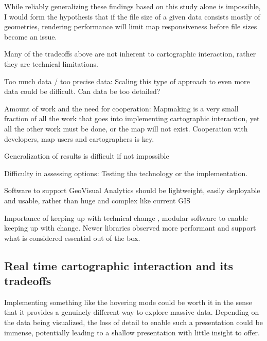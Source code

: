 While reliably generalizing these findings based on this study alone is impossible,
I would form the hypothesis that if the file size of a given data consists mostly of geometries,
rendering performance will limit map responsiveness before file sizes become an issue.

Many of the tradeoffs above are not inherent to cartographic interaction,
rather they are technical limitations.

Too much data / too precise data:
Scaling this type of approach to even more data could be difficult.
Can data be too detailed?

Amount of work and the need for cooperation:
Mapmaking is a very small fraction of all the work
that goes into implementing cartographic interaction,
yet all the other work must be done,
or the map will not exist.
Cooperation with developers, map users and cartographers is key.

Generalization of results is difficult if not impossible

Difficulty in assessing options: Testing the technology or the implementation.

Software to support GeoVisual Analytics should be lightweight, easily %
deployable and usable, rather than huge and complex like current GIS

Importance of keeping up with technical change \parencite{rot2014},
modular software to enable keeping up with change.
Newer libraries observed more performant and support what is considered essential out of the box.



\subsection{Real time cartographic interaction and its tradeoffs}

Implementing something like the hovering mode could be worth it in the sense
that it provides a genuinely different way to explore massive data.
Depending on the data being visualized,
the loss of detail to enable such a presentation could be immense,
potentially leading to a shallow presentation with little insight to offer.

